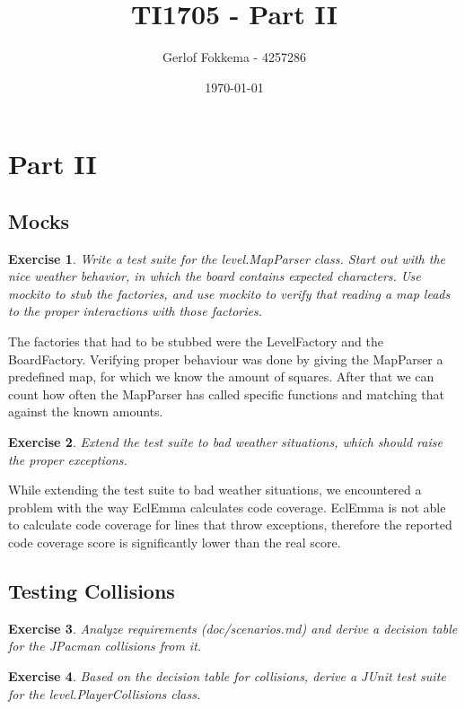 \documentclass[a4paper]{article}
\title{TI1705 - Part II}
\author{Gerlof Fokkema - 4257286}
\date{\today}
\newtheorem{thm}{Exercise}
\begin{document}
  \maketitle
  \section{Part II}
  
  \subsection{Mocks}
    \begin{thm}
      Write a test suite for the level.MapParser class. Start out with the nice
      weather behavior, in which the board contains expected characters. Use mockito
      to stub the factories, and use mockito to verify that reading a map leads to the
      proper interactions with those factories.
    \end{thm}
    The factories that had to be stubbed were the LevelFactory and the BoardFactory.
    Verifying proper behaviour was done by giving the MapParser a predefined map, for which we know the amount of squares.
    After that we can count how often the MapParser has called specific functions and matching that against the known amounts.

    \begin{thm}
      Extend the test suite to bad weather situations,
      which should raise the proper exceptions.
    \end{thm}
    While extending the test suite to bad weather situations, we encountered a problem with the way EclEmma calculates code coverage.
    EclEmma is not able to calculate code coverage for lines that throw exceptions, therefore the reported code coverage score is significantly lower than the real score.
    
  \subsection{Testing Collisions}
    \begin{thm}
      Analyze requirements (doc/scenarios.md) and derive a decision table for the
      JPacman collisions from it.
    \end{thm}

    \begin{thm}
      Based on the decision table for collisions, derive a JUnit test suite for the
      level.PlayerCollisions class.
    \end{thm}
\end{document}
